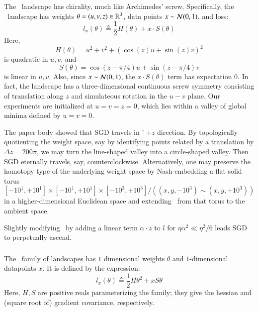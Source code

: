         \subsubsection{\Helix}
            The \Helix\ landscape has chirality, much like Archimedes'
            screw.
            Specifically, the \Helix\ landscape has
            weights     $\theta = (u,v,z) \in \mathbb{R}^3$,
            data points $x \sim \mathcal{N}(0, 1)$,
            and loss:
            $$
                l_x(\theta)
                \triangleq
                \frac{1}{2} H(\theta) + x \cdot S(\theta)
            $$
            Here,
            $$
                H(\theta) = u^2 + v^2 + (\cos(z) u + \sin(z) v)^2
            $$
            is quadratic in $u, v$, and
            $$
                S(\theta) = \cos(z-\pi/4) u + \sin(z-\pi/4) v
            $$
            is linear in $u, v$.
            Also, since $x \sim \mathcal{N}(0,1)$, the $x \cdot S(\theta)$ term has
            expectation $0$.
            In fact, the landscape has a three-dimensional continuous screw
            symmetry consisting of translation along $z$ and simulateous
            rotation in the $u-v$ plane.  Our experiments are initialized at
            $u=v=z=0$, which lies within a valley of global minima defined by
            $u=v=0$.  

            The paper body showed that SGD travels in \Helix' $+z$
            direction.  By topologically quotienting the weight space, say by
            identifying points related by a translation by $\Delta z = 200\pi$,
            we may turn the line-shaped valley into a circle-shaped valley.
            Then SGD eternally travels, say, counterclockwise.  Alternatively,
            one may preserve the homotopy type of the underlying weight space
            by Nash-embedding a flat solid torus
            $$
                [-10^1,+10^1]\times[-10^1,+10^1]\times[-10^3,+10^3]/((x,y,-10^3)\sim(x,y,+10^3))
            $$
            in a higher-dimensional Euclidean space and extending \Helix\ from
            that torus to the ambient space.

            Slightly modifying \Helix\ by adding a linear term $\alpha\cdot z$
            to $l$ for $\eta\alpha^2 \ll \eta^2/6$ leads SGD to perpetually ascend.
           
        \subsubsection{\MeanEstimation}
            The \MeanEstimation\, family of landscapes has $1$ dimensional
            weights $\theta$ and $1$-dimensional datapoints $x$.  It is defined
            by the expression:
            $$
                l_x(\theta)
                \triangleq
                \frac{1}{2} H \theta^2 + x S \theta
            $$
            Here, $H, S$ are positive reals parameterizing the family; they
            give the hessian and (square root of) gradient covariance,
            respectively.


